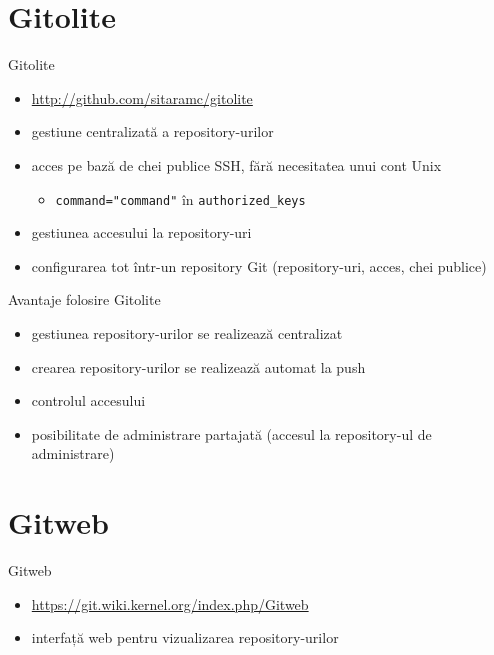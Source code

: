 \documentclass{simple}
\begin{document}
\section{Gitolite}

\begin{frame}{Gitolite}
	\begin{itemize}
		\item \url{http://github.com/sitaramc/gitolite}
        \item gestiune centralizată a repository-urilor
        \item acces pe bază de chei publice SSH, fără necesitatea unui cont Unix
          \begin{itemize}
            \item \texttt{command="command"} în \texttt{authorized\_keys}
          \end{itemize}
        \item gestiunea accesului la repository-uri
        \item configurarea tot într-un repository Git (repository-uri, acces,
        chei publice)
	\end{itemize}
\end{frame}

\begin{frame}{Avantaje folosire Gitolite}
	\begin{itemize}
		\item gestiunea repository-urilor se realizează centralizat
		\item crearea repository-urilor se realizează automat la push
        \item controlul accesului
        \item posibilitate de administrare partajată (accesul la repository-ul
        de administrare)
	\end{itemize}
\end{frame}

\section{Gitweb}

\begin{frame}{Gitweb}
	\begin{itemize}
		\item \url{https://git.wiki.kernel.org/index.php/Gitweb}
		\item interfață web pentru vizualizarea repository-urilor
	\end{itemize}
\end{frame}
\end{document}
